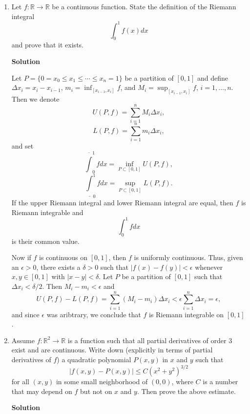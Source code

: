 \documentclass{article}
\begin{document}
\begin{enumerate}
\item Let \(f : \mathbb{R} \to \mathbb{R}\) be a continuous function.  State the definition of the Riemann integral
\[\int_0^1 f(x) dx\]
and prove that it exists.

{\bf Solution}

Let \(P = \{0 = x_0 \leq x_1 \leq \cdots \leq x_n = 1\}\) be a partition of \([0,1]\) and define \(\Delta x_i = x_i - x_{i - 1}\), \(m_i = \inf_{[x_{i - 1}, x_i]} f\), and \(M_i = \sup_{[x_{i - 1}, x_i]} f\), \(i = 1, \ldots, n\).  Then we denote
\[U(P,f) = \sum_{i = 1}^n M_i \Delta x_i,\]
\[L(P,f) = \sum_{i = 1}^n m_i \Delta x_i,\]
and set
\[\overline{\int}_0^1 f dx = \inf_{P \subset [0,1]} U(P,f),\]
\[\underline{\int}_0^1 f dx = \sup_{P \subset [0,1]} L(P,f).\]
If the upper Riemann integral and lower Riemann integral are equal, then \(f\) is Riemann integrable and
\[\int_0^1 f dx\]
is their common value.

Now if \(f\) is continuous on \([0,1]\), then \(f\) is uniformly continuous.  Thus, given an \(\epsilon > 0\), there exists a \(\delta > 0\) such that \(|f(x) - f(y)| < \epsilon\) whenever \(x,y \in [0,1]\) with \(|x - y| < \delta\).  Let \(P\) be a partition of \([0,1]\) such that \(\Delta x_i < \delta/2\).  Then \(M_i - m_i < \epsilon\) and
\[U(P,f) - L(P,f) = \sum_{i = 1}^n (M_i - m_i) \Delta x_i
                  < \epsilon \sum_{i = 1}^n \Delta x_i
                  = \epsilon,\]
and since \(\epsilon\) was aribtrary, we conclude that \(f\) is Riemann integrable on \([0,1]\).



\item Assume \(f : \mathbb{R}^2 \to \mathbb{R}\) is a function such that all partial derivatives of order \(3\) exist and are continuous.  Write down (explicitly in terms of partial derivatives of \(f\)) a quadratic polynomial \(P(x,y)\) in \(x\) and \(y\) such that
\[|f(x,y) - P(x,y)| \leq C(x^2 + y^2)^{3/2}\]
for all \((x,y)\) in some small neighborhood of \((0,0)\), where \(C\) is a number that may depend on \(f\) but not on \(x\) and \(y\).  Then prove the above estimate.

{\bf Solution}


\end{enumerate}
\end{document}
